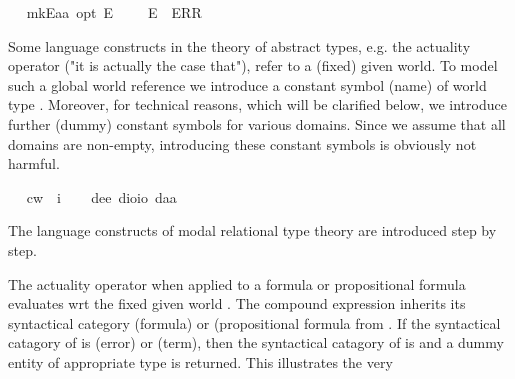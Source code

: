 \begin{isabellebody}
\ \isamarkupfalse%
\ mkE{\isacharcolon}{\isacharcolon}{\isachardoublequoteopen}{\isacharprime}a{\isasymRightarrow}{\isacharprime}a\ opt{\isachardoublequoteclose}\ {\isacharparenleft}{\isachardoublequoteopen}{\isacharunderscore}\isactrlsup E{\isachardoublequoteclose}\ {\isacharbrackleft}{}{}{}{\isacharbrackright}\ {}{}{}{\isacharparenright}\ \ \ {\isachardoublequoteopen}{\isasymphi}\isactrlsup E\ {\isasymequiv}\ ERR\ {\isasymphi}{\isachardoublequoteclose}%
\begin{isamarkuptext}%
Some language constructs in the theory of abstract types, e.g. the actuality operator  
  \isa{\isactrlbold {\isasymA}} ("it is actually the case that"), refer to a (fixed) given world. To model such a 
  global world reference we introduce a
  constant symbol (name)  of world type . Moreover, for technical reasons, 
  which will be clarified below, we introduce further (dummy) constant symbols for various domains. Since
  we assume that all domains are non-empty, introducing these constant symbols is obviously not harmful.%
\end{isamarkuptext}%
\isamarkuptrue%
\ \isamarkupfalse%
\ cw\ {\isacharcolon}{\isacharcolon}\ i\ \isanewline
\ \isamarkupfalse%
\ de{\isacharcolon}{\isacharcolon}{\isachardoublequoteopen}e{\isachardoublequoteclose}\ dio{\isacharcolon}{\isacharcolon}{\isachardoublequoteopen}io{\isachardoublequoteclose}\ da{\isacharcolon}{\isacharcolon}{\isacharprime}a%
\isamarkuptrue%
%
\begin{isamarkuptext}%
The language constructs of modal relational type theory are introduced step by step.%
\end{isamarkuptext}%
\isamarkuptrue%
%
\begin{isamarkuptext}%
The actuality operator \isa{\isactrlbold {\isasymA}} when applied to a formula or propositional formula 
  \isa{{\isasymphi}} evaluates \isa{{\isasymphi}} wrt the fixed given world . 
  The compound expression \isa{\isactrlbold {\isasymA}{\isasymphi}} inherits its syntactical category   (formula) or
   (propositional formula from \isa{{\isasymphi}}. If the syntactical catagory of  \isa{{\isasymphi}} is 
   (error) or  (term), then the syntactical catagory of \isa{\isactrlbold {\isasymA}{\isasymphi}} 
  is  and a dummy entity of appropriate type is returned. This illustrates the very 

\end{isamarkuptext}
\end{isabellebody}

